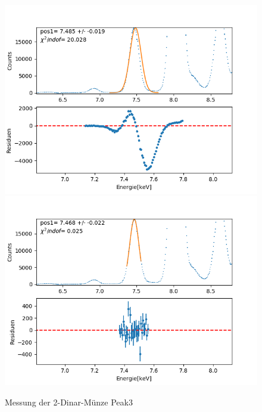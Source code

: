 \documentclass[12pt,a4paper]{article}
\begin{document}
\begin{figure}[H]
\centering
\includegraphics[scale=0.49]{Bilder/roentgen_spektren/denar/den3_1.png}
\includegraphics[scale=0.49]{Bilder/roentgen_spektren/denar/den3_2.png}
\caption{Messung der 2-Dinar-Münze Peak3}
\end{figure}
\end{document}
